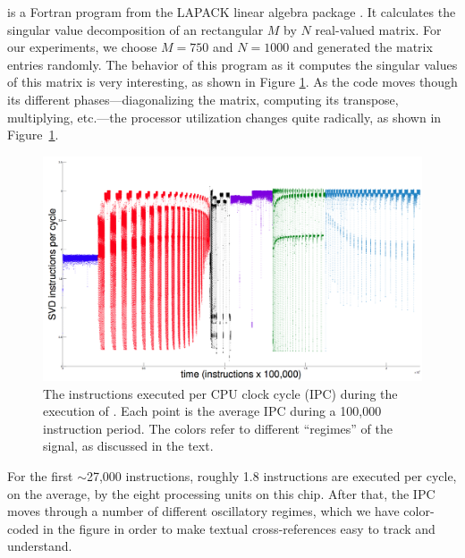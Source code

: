 \svd is a Fortran program from the LAPACK linear algebra package
\cite{lapack}.  It calculates the singular value decomposition of an
rectangular $M$ by $N$ real-valued matrix.  For our experiments, we
choose $M=750$ and $N=1000$ and generated the matrix entries randomly.
% 
% 
The behavior of this program as it computes the singular values of
this matrix is very interesting, as shown in Figure
\ref{fig:svd-ts-colored}.  As the code moves though its different
phases---diagonalizing the matrix, computing its transpose,
multiplying, etc.---the processor utilization changes quite radically,
as shown in Figure~\ref{fig:svd-ts-colored}.
\begin{figure}[t]
    \centering
    \includegraphics[width=\columnwidth]{figs/SVD1RegimesColored}
    \caption{The instructions executed per CPU clock cycle (IPC)
      during the execution of \svd. Each point is the average IPC
      during a 100,000 instruction period.  The colors refer to different
``regimes'' of the signal, as discussed in the text.}
    \label{fig:svd-ts-colored}
  \end{figure}
For the first $\sim$27,000 instructions, roughly 1.8 instructions are
executed per cycle, on the average, by the eight processing units on
this chip.  After that, the IPC moves through a number of different
oscillatory regimes, which we have color-coded in the figure in order
to make textual cross-references easy to track and understand.

